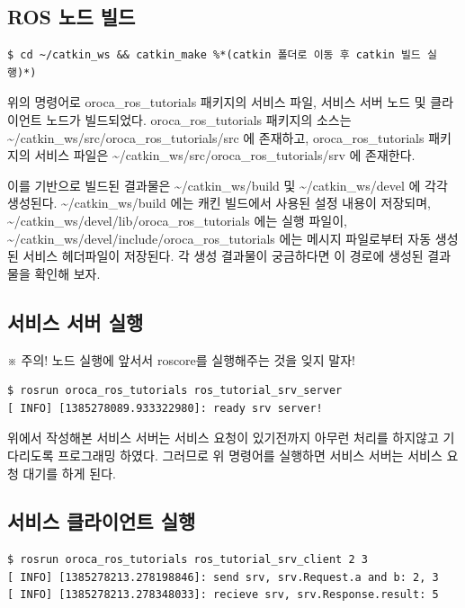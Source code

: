 \subsection{ROS 노드 빌드}

\begin{lstlisting}[language=ROS]
$ cd ~/catkin_ws && catkin_make %*(catkin 폴더로 이동 후 catkin 빌드 실행)*)
\end{lstlisting}

위의 명령어로 oroca\_ros\_tutorials 패키지의 서비스 파일, 서비스 서버 노드 및 클라이언트 노드가 빌드되었다. oroca\_ros\_tutorials 패키지의 소스는 \textasciitilde/catkin\_ws/src/oroca\_ros\_tutorials/src 에 존재하고, oroca\_ros\_tutorials 패키지의 서비스 파일은 \textasciitilde/catkin\_ws/src/oroca\_ros\_tutorials/srv 에 존재한다.

이를 기반으로 빌드된 결과물은 \textasciitilde/catkin\_ws/build 및 \textasciitilde/catkin\_ws/devel 에 각각 생성된다. \textasciitilde/catkin\_ws/build 에는 캐킨 빌드에서 사용된 설정 내용이 저장되며, \textasciitilde/catkin\_ws/devel/lib/oroca\_ros\_tutorials 에는 실행 파일이, \textasciitilde/catkin\_ws/devel/include/oroca\_ros\_tutorials 에는 메시지 파일로부터 자동 생성된 서비스 헤더파일이 저장된다. 각 생성 결과물이 궁금하다면 이 경로에 생성된 결과물을 확인해 보자.

\subsection{서비스 서버 실행}

※ 주의! 노드 실행에 앞서서 roscore를 실행해주는 것을 잊지 말자!

\begin{lstlisting}[language=ROS]
$ rosrun oroca_ros_tutorials ros_tutorial_srv_server 
[ INFO] [1385278089.933322980]: ready srv server!
\end{lstlisting}

위에서 작성해본 서비스 서버는 서비스 요청이 있기전까지 아무런 처리를 하지않고 기다리도록 프로그래밍 하였다. 그러므로 위 명령어를 실행하면 서비스 서버는 서비스 요청 대기를 하게 된다.

\subsection{서비스 클라이언트 실행}

\begin{lstlisting}[language=ROS]
$ rosrun oroca_ros_tutorials ros_tutorial_srv_client 2 3
[ INFO] [1385278213.278198846]: send srv, srv.Request.a and b: 2, 3
[ INFO] [1385278213.278348033]: recieve srv, srv.Response.result: 5
\end{lstlisting}

